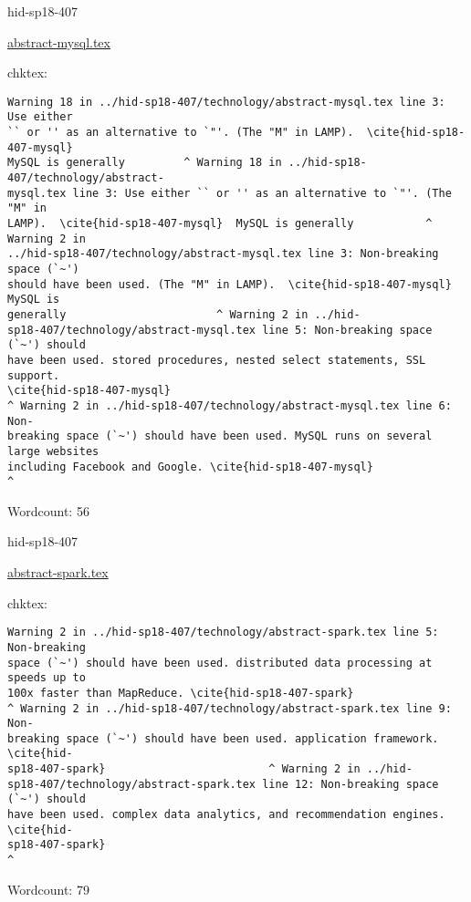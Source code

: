 \begin{IU}

hid-sp18-407

\href{https://github.com/cloudmesh-community/hid-sp18-407/blob/master//technology/abstract-mysql.tex}{abstract-mysql.tex}

 
chktex:
\begin{tiny}
\begin{verbatim}
Warning 18 in ../hid-sp18-407/technology/abstract-mysql.tex line 3: Use either
`` or '' as an alternative to `"'. (The "M" in LAMP).  \cite{hid-sp18-407-mysql}
MySQL is generally         ^ Warning 18 in ../hid-sp18-407/technology/abstract-
mysql.tex line 3: Use either `` or '' as an alternative to `"'. (The "M" in
LAMP).  \cite{hid-sp18-407-mysql}  MySQL is generally           ^ Warning 2 in
../hid-sp18-407/technology/abstract-mysql.tex line 3: Non-breaking space (`~')
should have been used. (The "M" in LAMP).  \cite{hid-sp18-407-mysql}  MySQL is
generally                       ^ Warning 2 in ../hid-
sp18-407/technology/abstract-mysql.tex line 5: Non-breaking space (`~') should
have been used. stored procedures, nested select statements, SSL support.
\cite{hid-sp18-407-mysql}
^ Warning 2 in ../hid-sp18-407/technology/abstract-mysql.tex line 6: Non-
breaking space (`~') should have been used. MySQL runs on several large websites
including Facebook and Google. \cite{hid-sp18-407-mysql}
^
\end{verbatim}
\end{tiny}

Wordcount: 56

\end{IU}



\begin{IU}

hid-sp18-407

\href{https://github.com/cloudmesh-community/hid-sp18-407/blob/master//technology/abstract-spark.tex}{abstract-spark.tex}

 
chktex:
\begin{tiny}
\begin{verbatim}
Warning 2 in ../hid-sp18-407/technology/abstract-spark.tex line 5: Non-breaking
space (`~') should have been used. distributed data processing at speeds up to
100x faster than MapReduce. \cite{hid-sp18-407-spark}
^ Warning 2 in ../hid-sp18-407/technology/abstract-spark.tex line 9: Non-
breaking space (`~') should have been used. application framework. \cite{hid-
sp18-407-spark}                         ^ Warning 2 in ../hid-
sp18-407/technology/abstract-spark.tex line 12: Non-breaking space (`~') should
have been used. complex data analytics, and recommendation engines.  \cite{hid-
sp18-407-spark}                                                       ^
\end{verbatim}
\end{tiny}

Wordcount: 79

\end{IU}

